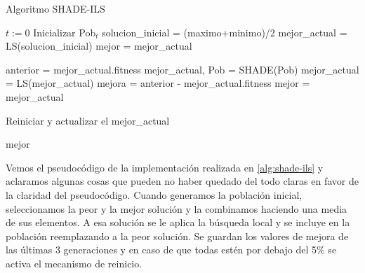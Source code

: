 \begin{algorithm}
\caption{Algoritmo SHADE-ILS}
\label{alg:shade-ils}
	\begin{algorithmic}
		\State $t:=0$
		\State Inicializar Pob$_t$
		\State solucion\_inicial = (maximo+minimo)/2
		\State mejor\_actual = LS(solucion\_inicial)
		\State mejor = mejor\_actual
		
			\State anterior = mejor\_actual.fitness
			\State mejor\_actual, Pob = SHADE(Pob)
			\State mejor\_actual = LS(mejor\_actual)
			\State mejora = anterior - mejor\_actual.fitness
				\State mejor = mejor\_actual
			\EndIf
			
				\State Reiniciar y actualizar el mejor\_actual
			\EndIf		
		\EndWhile
		
		\Return mejor
	\end{algorithmic}
\end{algorithm}

Vemos el pseudocódigo de la implementación realizada en \ref{alg:shade-ils} y aclaramos algunas cosas que pueden no haber quedado del todo claras en favor de la claridad del pseudocódigo. Cuando generamos la población inicial, seleccionamos la peor y la mejor solución y la combinamos haciendo una media de sus elementos. A esa solución se le aplica la búsqueda local y se incluye en la población reemplazando a la peor solución. Se guardan los valores de mejora de las últimas 3 generaciones y en caso de que todas estén por debajo del 5\% se activa el mecanismo de reinicio.





